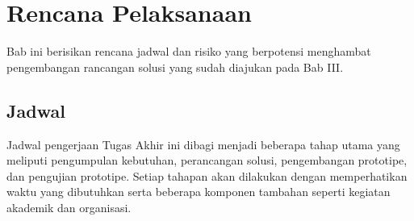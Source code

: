 \chapter{Rencana Pelaksanaan}

Bab ini berisikan rencana jadwal dan risiko yang berpotensi menghambat pengembangan rancangan solusi yang sudah diajukan pada Bab III.





\section{Jadwal}
\label{sec:jadwal}


Jadwal pengerjaan Tugas Akhir ini dibagi menjadi beberapa tahap utama yang meliputi pengumpulan kebutuhan, perancangan solusi, pengembangan prototipe, dan pengujian prototipe. Setiap tahapan akan dilakukan dengan memperhatikan waktu yang dibutuhkan serta beberapa komponen tambahan seperti kegiatan akademik dan organisasi.

